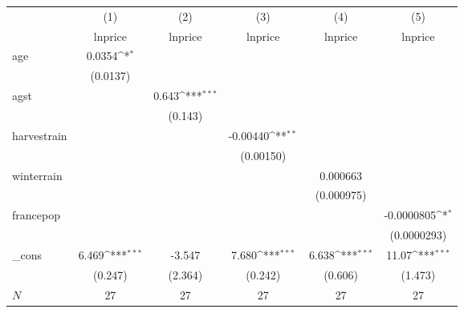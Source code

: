 {
\def\sym#1{\ifmmode^{#1}\else\(^{#1}\)\fi}
\begin{tabular}{l*{5}{c}}
\hline\hline
            &\multicolumn{1}{c}{(1)}&\multicolumn{1}{c}{(2)}&\multicolumn{1}{c}{(3)}&\multicolumn{1}{c}{(4)}&\multicolumn{1}{c}{(5)}\\
            &\multicolumn{1}{c}{lnprice}&\multicolumn{1}{c}{lnprice}&\multicolumn{1}{c}{lnprice}&\multicolumn{1}{c}{lnprice}&\multicolumn{1}{c}{lnprice}\\
\hline
age         &      0.0354\sym{*}  &                     &                     &                     &                     \\
            &    (0.0137)         &                     &                     &                     &                     \\
[1em]
agst        &                     &       0.643\sym{***}&                     &                     &                     \\
            &                     &     (0.143)         &                     &                     &                     \\
[1em]
harvestrain &                     &                     &    -0.00440\sym{**} &                     &                     \\
            &                     &                     &   (0.00150)         &                     &                     \\
[1em]
winterrain  &                     &                     &                     &    0.000663         &                     \\
            &                     &                     &                     &  (0.000975)         &                     \\
[1em]
francepop   &                     &                     &                     &                     &  -0.0000805\sym{*}  \\
            &                     &                     &                     &                     & (0.0000293)         \\
[1em]
\_cons      &       6.469\sym{***}&      -3.547         &       7.680\sym{***}&       6.638\sym{***}&       11.07\sym{***}\\
            &     (0.247)         &     (2.364)         &     (0.242)         &     (0.606)         &     (1.473)         \\
\hline
\(N\)       &          27         &          27         &          27         &          27         &          27         \\

\end{tabular}}
